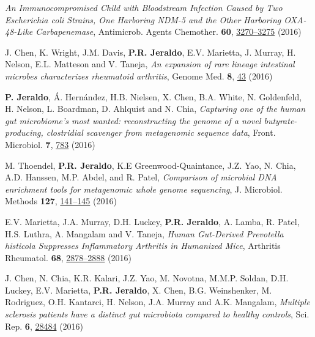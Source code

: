 \documentclass[letterpaper]{article}
\renewenvironment{itemize}{
  \begin{list}{}{
    \setlength{\leftmargin}{1.5em}
  }
}{
  \end{list}
}
\begin{document}
\begin{itemize}
\textit{An Immunocompromised Child with Bloodstream Infection Caused by Two Escherichia coli Strains, One Harboring NDM-5 and the Other Harboring OXA-48-Like Carbapenemase},
Antimicrob. Agents Chemother. \textbf{60}, \href{http://dx.doi.org/10.1128/AAC.03118-15}{3270--3275} (2016)
\item J. Chen, K. Wright, J.M. Davis, \textbf{P.R. Jeraldo}, E.V. Marietta, J. Murray, H. Nelson, E.L. Matteson and V. Taneja,
\textit{An expansion of rare lineage intestinal microbes characterizes rheumatoid arthritis},
Genome Med. \textbf{8}, \href{http://dx.doi.org/10.1186/s13073-016-0299-7}{43} (2016)
\item \textbf{P. Jeraldo}, Á. Hernández, H.B. Nielsen, X. Chen, B.A. White, N. Goldenfeld, H. Nelson, L. Boardman, D. Ahlquist and N. Chia,
\textit{Capturing one of the human gut microbiome’s most wanted: reconstructing the genome of a novel butyrate-producing, clostridial scavenger from metagenomic sequence data},
Front. Microbiol. \textbf{7}, \href{http://dx.doi.org/10.3389/fmicb.2016.00783}{783} (2016)
\item M. Thoendel, \textbf{P.R. Jeraldo}, K.E Greenwood-Quaintance, J.Z. Yao, N. Chia, A.D. Hanssen, M.P. Abdel, and R. Patel,
\textit{Comparison of microbial DNA enrichment tools for metagenomic whole genome sequencing},
J. Microbiol. Methods \textbf{127}, \href{http://dx.doi.org/10.1016/j.mimet.2016.05.022}{141--145} (2016)
\item E.V. Marietta, J.A. Murray, D.H. Luckey, \textbf{P.R. Jeraldo}, A. Lamba, R. Patel, H.S. Luthra, A. Mangalam and V. Taneja,
\textit{Human Gut-Derived Prevotella histicola Suppresses Inflammatory Arthritis in Humanized Mice},
Arthritis Rheumatol. \textbf{68}, \href{http://dx.doi.org/10.1002/art.39785}{2878--2888} (2016)
\item J. Chen, N. Chia, K.R. Kalari, J.Z. Yao, M. Novotna, M.M.P. Soldan, D.H. Luckey, E.V. Marietta, \textbf{P.R. Jeraldo}, X. Chen, B.G. Weinshenker, M. Rodriguez, O.H. Kantarci, H. Nelson, J.A. Murray and A.K. Mangalam,
\textit{Multiple sclerosis patients have a distinct gut microbiota compared to healthy controls},
Sci. Rep. \textbf{6}, \href{http://dx.doi.org/10.1038/srep28484}{28484} (2016)

\end{itemize}

\end{document}
